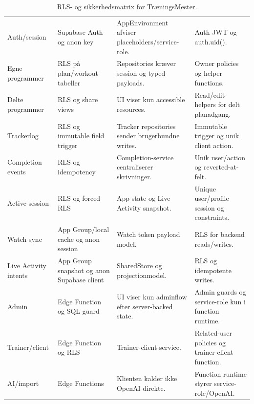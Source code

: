 \begin{table}[htbp]
\footnotesize
\renewcommand{\arraystretch}{1.12}
\begin{tabularx}{\textwidth}{>{\RaggedRight\arraybackslash}p{} >{\RaggedRight\arraybackslash}p{} >{\RaggedRight\arraybackslash}p{} Y}
\toprule
{} &  &  &  \\
\midrule
Auth/session & Supabase Auth og anon key & AppEnvironment afviser placeholders/service-role. & Auth JWT og auth.uid(). \\
Egne programmer & RLS på plan/workout-tabeller & Repositories kræver session og typed payloads. & Owner policies og helper functions. \\
Delte programmer & RLS og share views & UI viser kun accessible resources. & Read/edit helpers for delt planadgang. \\
Trackerlog & RLS og immutable field trigger & Tracker repositories sender brugerbundne writes. & Immutable trigger og unik client action. \\
Completion events & RLS og idempotency & Completion-service centraliserer skrivninger. & Unik user/action og reverted-at-felt. \\
Active session & RLS og forced RLS & App state og Live Activity snapshot. & Unique user/profile session og constraints. \\
Watch sync & App Group/local cache og anon session & Watch token payload model. & RLS for backend reads/writes. \\
Live Activity intents & App Group snapshot og anon Supabase client & SharedStore og projectionmodel. & RLS og idempotente writes. \\
Admin & Edge Function og SQL guard & UI viser kun adminflow efter server-backed state. & Admin guards og service-role kun i function runtime. \\
Trainer/client & Edge Function og RLS & Trainer-client-service. & Related-user policies og trainer-client function. \\
AI/import & Edge Functions & Klienten kalder ikke OpenAI direkte. & Function runtime styrer service-role/OpenAI. \\
\bottomrule
\end{tabularx}
\caption{RLS- og sikkerhedsmatrix for TræningsMester.}
\label{tab:tm-rls-matrix}
\end{table}

\clearpage


